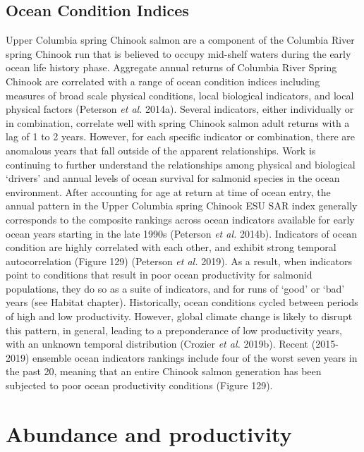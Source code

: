 \documentclass[
  letterpaper,
  oneside,
  open=any]{scrbook}
\begin{document}
\hypertarget{ocean-condition-indices}{%
\subsection{Ocean Condition Indices}\label{ocean-condition-indices}}

Upper Columbia spring Chinook salmon are a component of the Columbia
River spring Chinook run that is believed to occupy mid-shelf waters
during the early ocean life history phase. Aggregate annual returns of
Columbia River Spring Chinook are correlated with a range of ocean
condition indices including measures of broad scale physical conditions,
local biological indicators, and local physical factors (Peterson
\emph{et al.} 2014a). Several indicators, either individually or in
combination, correlate well with spring Chinook salmon adult returns
with a lag of 1 to 2 years. However, for each specific indicator or
combination, there are anomalous years that fall outside of the apparent
relationships. Work is continuing to further understand the
relationships among physical and biological `drivers' and annual levels
of ocean survival for salmonid species in the ocean environment. After
accounting for age at return at time of ocean entry, the annual pattern
in the Upper Columbia spring Chinook ESU SAR index generally corresponds
to the composite rankings across ocean indicators available for early
ocean years starting in the late 1990s (Peterson \emph{et al.} 2014b).
Indicators of ocean condition are highly correlated with each other, and
exhibit strong temporal autocorrelation (Figure 129) (Peterson \emph{et
al.} 2019). As a result, when indicators point to conditions that result
in poor ocean productivity for salmonid populations, they do so as a
suite of indicators, and for runs of `good' or `bad' years (see Habitat
chapter). Historically, ocean conditions cycled between periods of high
and low productivity. However, global climate change is likely to
disrupt this pattern, in general, leading to a preponderance of low
productivity years, with an unknown temporal distribution (Crozier
\emph{et al.} 2019b). Recent (2015-2019) ensemble ocean indicators
rankings include four of the worst seven years in the past 20, meaning
that an entire Chinook salmon generation has been subjected to poor
ocean productivity conditions (Figure 129).

\hypertarget{abundance-and-productivity-1}{%
\section{Abundance and
productivity}\label{abundance-and-productivity-1}}
\end{document}
